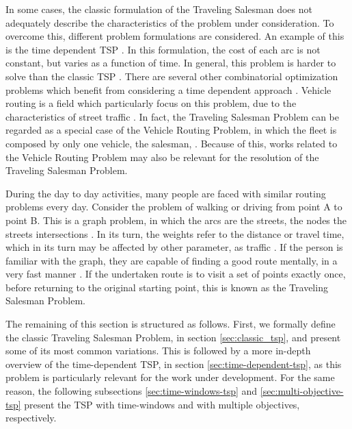 In some cases, the classic formulation of the Traveling Salesman does not adequately describe the characteristics of the problem under consideration. To overcome this, different problem formulations are considered. An example of this is the time dependent TSP \cite{cite_12}. In this formulation, the cost of each arc is not constant, but varies as a function of time. In general, this problem is harder to solve than the classic TSP \cite{cite_21}. There are several other combinatorial optimization problems which benefit from considering a time dependent approach \cite{cite_20}. Vehicle routing is a field which particularly focus on this problem, due to the characteristics of street traffic \cite{cite_19}. In fact, the Traveling Salesman Problem can be regarded as a special case of the Vehicle Routing Problem, in which the fleet is composed by only one vehicle, the salesman, \cite{cite_19}. Because of this, works related to the Vehicle Routing Problem may also be relevant for the resolution of the Traveling Salesman Problem.

During the day to day activities, many people are faced with similar routing problems every day. Consider the problem of walking or driving from point A to point B. This is a graph problem, in which the arcs are the streets, the nodes the streets intersections \cite{cite_11}. In its turn, the weights refer to the distance or travel time, which in its turn may be affected by other parameter, as traffic \cite{cite_12}. If the person is familiar with the graph, they are capable of finding a good route mentally, in a very fast manner \cite{cite_13}. If the undertaken route is to visit a set of points exactly once, before returning to the original starting point, this is known as the Traveling Salesman Problem. 

The remaining of this section is structured as follows. First, we formally define the classic Traveling Salesman Problem, in section \ref{sec:classic_tsp}, and present some of its most common variations. This is followed by a more in-depth overview of the time-dependent TSP, in section \ref{sec:time-dependent-tsp}, as this problem is particularly relevant for the work under development. For the same reason, the following subsections \ref{sec:time-windows-tsp} and \ref{sec:multi-objective-tsp} present the TSP with time-windows and with multiple objectives, respectively. 